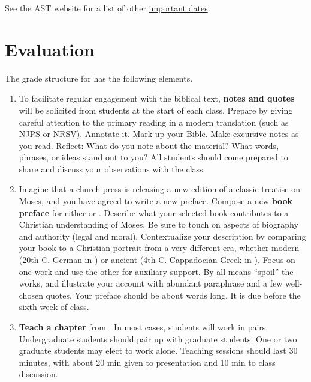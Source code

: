 \documentclass[titlepage]{article}
\begin{document}
See the AST website for a list of other \href{https://www.astheology.ns.ca/students/index.html}{important dates}.

\section{Evaluation}
\label{evaluation}

The grade structure for \ccode has the following elements.

\begin{enumerate}

	\item To facilitate regular engagement with the biblical text,
	\textbf{notes and quotes} will be solicited from students at the
	start of each class. Prepare by giving careful attention to the
	primary reading in a modern translation (such as NJPS or NRSV).
	Annotate it. Mark up your Bible. Make excursive notes as you read.
	Reflect: What do you note about the material? What words, phrases,
	or ideas stand out to you?  All students should come prepared
	to share and discuss your observations with the class.

	\item Imagine that a church press is releasing a new edition of a
	classic treatise on Moses, and you have agreed to write a new
	preface. Compose a new \textbf{book preface} for either \cite{nyssa}
	or \cite{vonrad}. Describe what your selected book contributes to a
	Christian understanding of Moses. Be sure to touch on aspects of
	biography and authority (legal and moral). Contextualize your
	description by comparing your book to a Christian portrait from a
	very different era, whether modern (20th C. German in \cite{vonrad})
	or ancient (4th C. Cappadocian Greek in \cite{nyssa}). Focus on one
	work and use the other for auxiliary support. By all means “spoil”
	the works, and illustrate your account with abundant paraphrase and
	a few well-chosen quotes. Your preface should be about
	 words long. It is due before the sixth week of
	class.

	\item \textbf{Teach a chapter} from \cite{sommer}. In most cases,
	students will work in pairs. Undergraduate students should pair up
	with graduate students. One or two graduate students may elect to
	work alone. Teaching sessions should last 30 minutes, with about 20
	min given to presentation and 10 min to class discussion.


\end{enumerate}
\end{document}
